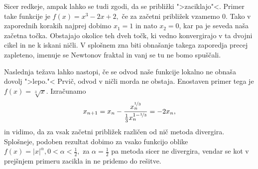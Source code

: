 \documentclass[12pt,a4paper]{amsart}
\theoremstyle{definition} %
\theoremstyle{plain} %
\begin{document}
Sicer redkeje, ampak lahko se tudi zgodi, da se približki ">zaciklajo"<. Primer take funkcije je $f(x) = x^3 - 2x + 2,$ če za začetni približek vzamemo 0. Tako v zaporednih korakih najprej dobimo
$x_{1} = 1$ in nato $x_{2} = 0$, kar pa je seveda naša začetna točka. Obstajajo okolice teh dveh točk, ki vedno konvergirajo v ta dvojni cikel in ne k iskani ničli. V splošnem 
zna biti obnašanje takega zaporedja precej zapleteno, imenuje se Newtonov fraktal in vanj se tu ne bomo spuščali.

Naslednja težava lahko nastopi, če se odvod naše funkcije lokalno ne obnaša dovolj ">lepo."< Prvič, odvod v ničli morda ne obstaja. Enostaven primer tega je 
$f(x) = \sqrt[3]{x}.$ Izračunamo
\[
    x_{n+1} = x_{n} - \frac{x_{n} ^ {\nicefrac{1}{3}}}{\frac{1}{3}x_{n}^{1 - \nicefrac{1}{3}}} = -2x_{n},
\]
in vidimo, da za vsak začetni približek različen od nič metoda divergira. Splošneje, podoben rezultat dobimo za vsako funkcijo oblike $f(x) = \lvert x \rvert^{\alpha}, 0 < \alpha < \frac{1}{2},$
za $\alpha = \frac{1}{2}$ pa metoda sicer ne divergira, vendar se kot v prejšnjem primeru zacikla in ne pridemo do rešitve.
\end{document}
